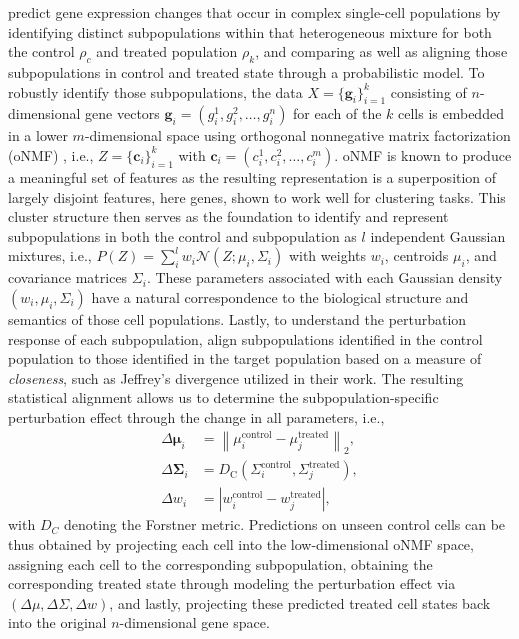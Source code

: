 \citet{chen2020dissecting} predict gene expression changes that occur in complex single-cell populations by identifying distinct subpopulations within that heterogeneous mixture for both the control $\rho_c$ and treated population $\rho_k$, and comparing as well as aligning those subpopulations in control and treated state through a probabilistic model.
To robustly identify those subpopulations, the data $X = \{ \mathbf{g}_i \}_{i=1}^k$ consisting of $n$-dimensional gene vectors $\mathbf{g}_i = (g_i^1, g_i^2, \dots, g_i^n)$ for each of the $k$ cells is embedded in a lower $m$-dimensional space using orthogonal nonnegative matrix factorization (oNMF) \citep{asteris2015orthogonal}, i.e., $Z = \{ \mathbf{c}_i \}_{i=1}^k$ with $\mathbf{c}_i = (c_i^1, c_i^2, \dots, c_i^m)$. oNMF is known to produce a meaningful set of features as the resulting representation is a superposition of largely disjoint features, here genes, shown to work well for clustering tasks.
This cluster structure then serves as the foundation to identify and represent subpopulations in both the control and subpopulation as $l$ independent Gaussian mixtures, i.e., $P(Z) = \sum_i^l w_i \mathcal{N}(Z; \mu_i, \Sigma_i)$ with weights $w_i$, centroids $\mu_i$, and covariance matrices $\Sigma_i$.
These parameters associated with each Gaussian density $(w_i, \mu_i, \Sigma_i)$ have a natural correspondence to the biological structure and semantics of those cell populations.
Lastly, to understand the perturbation response of each subpopulation, \citet{chen2020dissecting} align subpopulations identified in the control population to those identified in the target population based on a measure of \emph{closeness}, such as Jeffrey's divergence utilized in their work. The resulting statistical alignment allows us to determine the subpopulation-specific perturbation effect through the change in all parameters, i.e.,
\begin{align*}
	\Delta \boldsymbol{\mu}_i &=\left\|\mu_i^{\text {control}}-\mu_j^{\text {treated}}\right\|_2, \\
	\Delta \boldsymbol{\Sigma}_i &=D_{\mathrm{C}}\left(\Sigma_i^{\text {control}}, \Sigma_j^{\text {treated}}\right), \\
	\Delta w_i &=\left|w_i^{\text {control}}-w_j^{\text {treated}}\right|,
\end{align*}
with $D_C$ denoting the Forstner metric. Predictions on unseen control cells can be thus obtained by projecting each cell into the low-dimensional oNMF space, assigning each cell to the corresponding subpopulation, obtaining the corresponding treated state through modeling the perturbation effect via $(\Delta \mu, \Delta \Sigma, \Delta w)$, and lastly, projecting these predicted treated cell states back into the original $n$-dimensional gene space.

